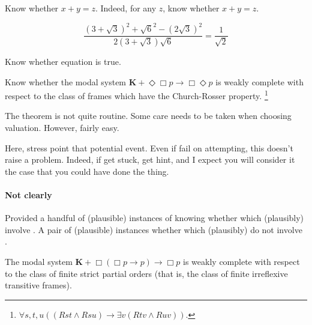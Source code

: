 \begin{note}
  Know whether \(x + y = z\).
  Indeed, for any \(z\), know whether \(x + y = z\).

  \[\frac{(3 + \sqrt{3})^{2} + \sqrt{6}^{2} - (2\sqrt{3})^{2}}{2(3 + \sqrt{3})\sqrt{6}} = \frac{1}{\sqrt{2}}\]

  Know whether equation is true.
\end{note}

\begin{note}
  Know whether the modal system \(\mathbf{K} + \Diamond\Box p \rightarrow \Box\Diamond p\) is weakly complete with respect to the class of frames which have the Church-Rosser property.%
  \footnote{
    \(\forall s,t,u((Rst \land Rsu) \rightarrow \exists v(Rtv \land Ruv))\).
  }

  The theorem is not quite routine.
  Some care needs to be taken when choosing valuation.
  However, fairly easy.

  Here, stress point that potential event.
  Even if fail on attempting, this doesn't raise a problem.
  Indeed, if get stuck, get hint, and I expect you will consider it the case that you could have done the thing.
\end{note}

\paragraph{Not clearly }

\begin{note}
  Provided a handful of (plausible) instances of knowing whether which (plausibly) involve .
  A pair of (plausible) instances whether which (plausibly) do not involve .
\end{note}

\begin{note}[ML II]
  The modal system \(\mathbf{K} + \Box(\Box p \rightarrow p) \rightarrow \Box p\) is weakly complete with respect to the class of finite strict partial orders (that is, the class of finite irreflexive transitive frames).
\end{note}

